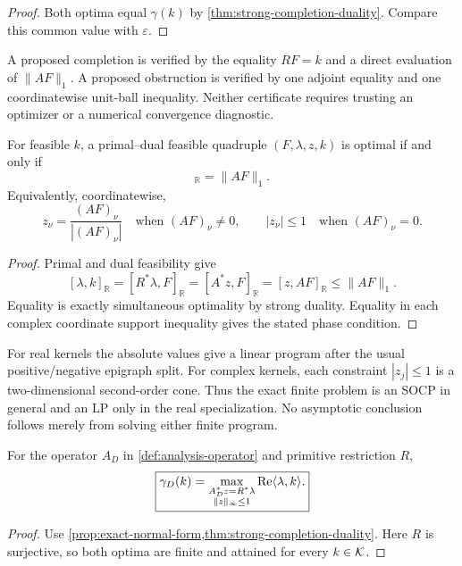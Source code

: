 \begin{proof}
Both optima equal \(\gamma(k)\) by
\cref{thm:strong-completion-duality}.  Compare this common value with
\(\varepsilon\).
\end{proof}

\begin{remark}
A proposed completion is verified by the equality \(RF=k\) and a direct
evaluation of \(\|AF\|_1\).  A proposed obstruction is verified by one
adjoint equality and one coordinatewise unit-ball inequality.  Neither
certificate requires trusting an optimizer or a numerical convergence
diagnostic.
\end{remark}

\begin{corollary}
\label{cor:KKT-certificate}
For feasible \(k\), a primal--dual feasible quadruple
\((F,\lambda,z,k)\) is optimal if and only if
\begin{equation}
 [z,AF]_{\mathbb R}=\|AF\|_1.
 \label{eq:KKT-saturation}
\end{equation}
Equivalently, coordinatewise,
\[
 z_\nu=
 \frac{(AF)_\nu}{|(AF)_\nu|}
 \quad\text{when }(AF)_\nu\ne0,
 \qquad
 |z_\nu|\le1
 \quad\text{when }(AF)_\nu=0.
\]
\end{corollary}

\begin{proof}
Primal and dual feasibility give
\[
 [\lambda,k]_{\mathbb R}
 =
 [R^*\lambda,F]_{\mathbb R}
 =
 [A^*z,F]_{\mathbb R}
 =
 [z,AF]_{\mathbb R}
 \le\|AF\|_1.
\]
Equality is exactly simultaneous optimality by strong duality.  Equality
in each complex coordinate support inequality gives the stated phase
condition.
\end{proof}

\begin{remark}
For real kernels the absolute values give a linear program after the
usual positive/negative epigraph split.  For complex kernels, each
constraint \(|z_j|\le1\) is a two-dimensional second-order cone.
Thus the exact finite problem is an SOCP in general and an LP only in the
real specialization.  No asymptotic conclusion follows merely from
solving either finite program.
\end{remark}

\begin{corollary}
\label{cor:tpc73-gauge-dual}
For the operator \(A_D\) in
\cref{def:analysis-operator} and primitive restriction \(R\),
\begin{equation}
 \boxed{
 \gamma_D(k)
 =
 \max_{\substack{A_D^*z=R^*\lambda\\\|z\|_\infty\le1}}
 \operatorname{Re}\langle\lambda,k\rangle.}
 \label{eq:tpc73-gauge-dual}
\end{equation}
\end{corollary}

\begin{proof}
Use \cref{prop:exact-normal-form,thm:strong-completion-duality}.  Here
\(R\) is surjective, so both optima are finite and attained for every
\(k\in\mathcal K\).
\end{proof}
